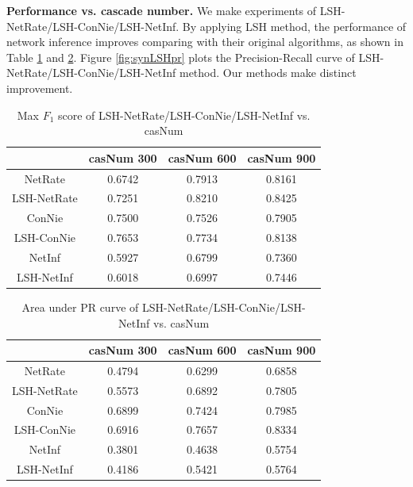 \textbf{Performance vs. cascade number.} We make experiments of LSH-NetRate/LSH-ConNie/LSH-NetInf. By applying LSH method, the performance of network inference improves comparing with their original algorithms, as shown in Table \ref{tab:synLSHCASf1} and \ref{tab:synLSHCASAUC}. Figure \ref{fig:synLSHpr} plots the Precision-Recall curve of LSH-NetRate/LSH-ConNie/LSH-NetInf method. Our methods make distinct improvement.
\begin{table}[h]
\caption{Max $F_1$ score of LSH-NetRate/LSH-ConNie/LSH-NetInf vs. casNum}
\begin{tabular}{c|c|c|c}
 & casNum 300 & casNum 600 & casNum 900 \\
\hline
NetRate & 0.6742 & 0.7913 & 0.8161\\
LSH-NetRate & 0.7251 & 0.8210 & 0.8425\\
\hline
ConNie & 0.7500 & 0.7526 & 0.7905\\
LSH-ConNie & 0.7653 & 0.7734 & 0.8138\\
\hline
NetInf & 0.5927 & 0.6799 & 0.7360\\
LSH-NetInf & 0.6018 & 0.6997 & 0.7446
\end{tabular}\label{tab:synLSHCASf1}
\end{table}
\begin{table}[h]
\caption{Area under PR curve of LSH-NetRate/LSH-ConNie/LSH-NetInf vs. casNum}
\begin{tabular}{c|c|c|c}
 & casNum 300 & casNum 600 & casNum 900 \\
\hline
NetRate & 0.4794 & 0.6299 & 0.6858\\
LSH-NetRate & 0.5573 & 0.6892 & 0.7805\\
\hline
ConNie & 0.6899 & 0.7424 & 0.7985\\
LSH-ConNie & 0.6916 & 0.7657 & 0.8334\\
\hline
NetInf & 0.3801 & 0.4638 & 0.5754\\
LSH-NetInf & 0.4186 & 0.5421 & 0.5764
\end{tabular}\label{tab:synLSHCASAUC}
\end{table}

